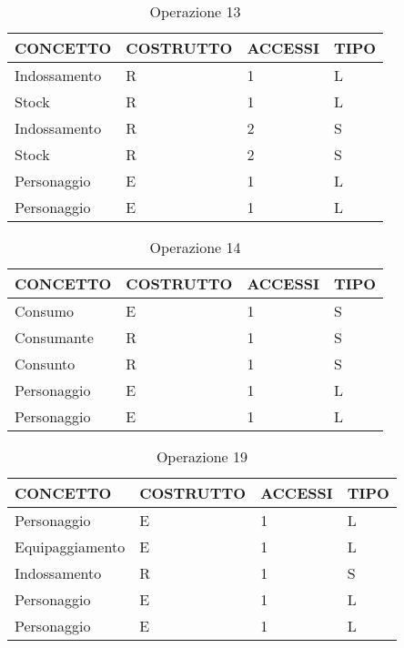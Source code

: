 \begin{table}[H]
\centering
\caption{Operazione 13}
\label{my-label}
\begin{tabular}{|l|l|l|l|}
\hline
\textbf{CONCETTO} & \textbf{COSTRUTTO} & \textbf{ACCESSI} & \textbf{TIPO} \\ \hline
Indossamento      & R                  & 1                & L             \\ \hline
Stock             & R                  & 1                & L             \\ \hline
Indossamento      & R                  & 2                & S             \\ \hline
Stock             & R                  & 2                & S             \\ \hline
Personaggio       & E                  & 1                & L             \\ \hline
Personaggio       & E                  & 1                & L             \\ \hline
\end{tabular}
\end{table}



\begin{table}[H]
\centering
\caption{Operazione 14}
\label{my-label}
\begin{tabular}{|l|l|l|l|}
\hline
\textbf{CONCETTO} & \textbf{COSTRUTTO} & \textbf{ACCESSI} & \textbf{TIPO} \\ \hline
Consumo           & E                  & 1                & S             \\ \hline
Consumante        & R                  & 1                & S             \\ \hline
Consunto          & R                  & 1                & S             \\ \hline
Personaggio       & E                  & 1                & L             \\ \hline
Personaggio       & E                  & 1                & L             \\ \hline
\end{tabular}
\end{table}


\begin{table}[H]
\centering
\caption{Operazione 19}
\label{my-label}
\begin{tabular}{|l|l|l|l|}
\hline
\textbf{CONCETTO} & \textbf{COSTRUTTO} & \textbf{ACCESSI} & \textbf{TIPO} \\ \hline
Personaggio       & E                  & 1                & L             \\ \hline
Equipaggiamento   & E                  & 1                & L             \\ \hline
Indossamento      & R                  & 1                & S             \\ \hline
Personaggio       & E                  & 1                & L             \\ \hline
Personaggio       & E                  & 1                & L             \\ \hline
\end{tabular}
\end{table}


